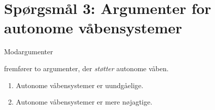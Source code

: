 \section{Spørgsmål 3: Argumenter for autonome våbensystemer} %


\begin{frame}{Modargumenter}

      \citep[s. 703--707]{asaro} fremfører to argumenter, der \textit{støtter} autonome
      våben.

      \pause

      \begin{enumerate}
          \item Autonome våbensystemer er uundgåelige.

          \pause

          \item Autonome våbensystemer er mere nøjagtige.
      \end{enumerate} 


  \end{frame}

